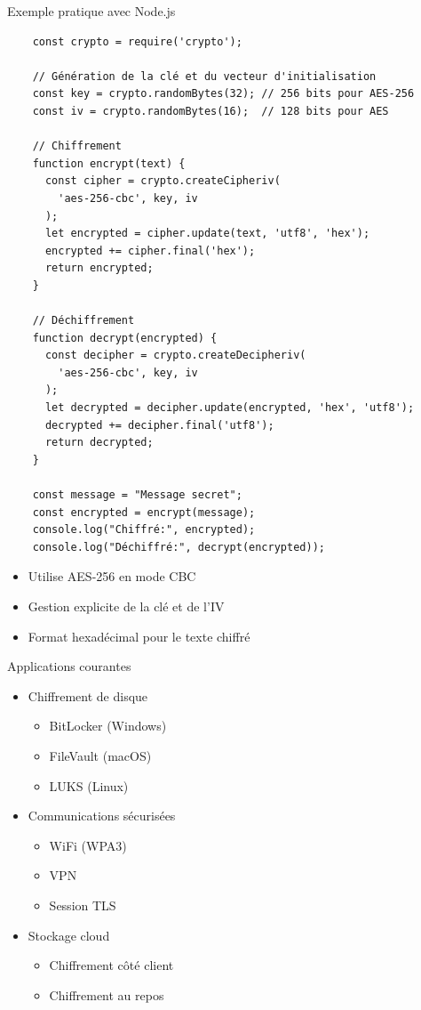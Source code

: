\begin{frame}[fragile]{Exemple pratique avec Node.js}
  \begin{verbatim}
    const crypto = require('crypto');

    // Génération de la clé et du vecteur d'initialisation
    const key = crypto.randomBytes(32); // 256 bits pour AES-256
    const iv = crypto.randomBytes(16);  // 128 bits pour AES

    // Chiffrement
    function encrypt(text) {
      const cipher = crypto.createCipheriv(
        'aes-256-cbc', key, iv
      );
      let encrypted = cipher.update(text, 'utf8', 'hex');
      encrypted += cipher.final('hex');
      return encrypted;
    }

    // Déchiffrement
    function decrypt(encrypted) {
      const decipher = crypto.createDecipheriv(
        'aes-256-cbc', key, iv
      );
      let decrypted = decipher.update(encrypted, 'hex', 'utf8');
      decrypted += decipher.final('utf8');
      return decrypted;
    }

    const message = "Message secret";
    const encrypted = encrypt(message);
    console.log("Chiffré:", encrypted);
    console.log("Déchiffré:", decrypt(encrypted));
  \end{verbatim}

  \begin{itemize}
    \item Utilise AES-256 en mode CBC
    \item Gestion explicite de la clé et de l'IV
    \item Format hexadécimal pour le texte chiffré
  \end{itemize}
\end{frame}

\begin{frame}{Applications courantes}
  \begin{itemize}
    \item Chiffrement de disque
      \begin{itemize}
        \item BitLocker (Windows)
        \item FileVault (macOS)
        \item LUKS (Linux)
      \end{itemize}
    \item Communications sécurisées
      \begin{itemize}
        \item WiFi (WPA3)
        \item VPN
        \item Session TLS
      \end{itemize}
    \item Stockage cloud
      \begin{itemize}
        \item Chiffrement côté client
        \item Chiffrement au repos
      \end{itemize}
  \end{itemize}
\end{frame}


